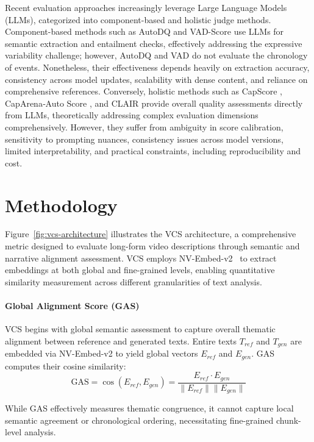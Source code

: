 \documentclass[letterpaper]{article} %
\begin{document}
Recent evaluation approaches increasingly leverage Large Language Models (LLMs), categorized into component-based and holistic judge methods. Component-based methods such as AutoDQ \citep{wyzs:24} and VAD-Score \citep{dp:25} use LLMs for semantic extraction and entailment checks, effectively addressing the expressive variability challenge; however, AutoDQ and VAD do not evaluate the chronology of events. Nonetheless, their effectiveness depends heavily on extraction accuracy, consistency across model updates, scalability with dense content, and reliance on comprehensive references. Conversely, holistic methods such as CapScore \citep{li:24}, CapArena‑Auto Score \citep{cheng:25}, and CLAIR \citep{chan:23} provide overall quality assessments directly from LLMs, theoretically addressing complex evaluation dimensions comprehensively. However, they suffer from ambiguity in score calibration, sensitivity to prompting nuances, consistency issues across model versions, limited interpretability, and practical constraints, including reproducibility and cost.

\section{Methodology}
\label{sec:methodology_vcs}

Figure~\ref{fig:vcs-architecture} illustrates the VCS architecture, a comprehensive metric designed to evaluate long-form video descriptions through semantic and narrative alignment assessment. VCS employs NV-Embed-v2~\citep{l:24} to extract embeddings at both global and fine-grained levels, enabling quantitative similarity measurement across different granularities of text analysis.

\paragraph{Global Alignment Score (GAS)}
VCS begins with global semantic assessment to capture overall thematic alignment between reference and generated texts. Entire texts $T_{ref}$ and $T_{gen}$ are embedded via NV-Embed-v2 to yield global vectors $E_{ref}$ and $E_{gen}$. GAS computes their cosine similarity:
\begin{equation} \label{eq:gas_revised}
\text{GAS} = \cos(E_{ref}, E_{gen}) = \frac{E_{ref} \cdot E_{gen}}{\|E_{ref}\| \|E_{gen}\|}
\end{equation}

While GAS effectively measures thematic congruence, it cannot capture local semantic agreement or chronological ordering, necessitating fine-grained chunk-level analysis.
\end{document}
